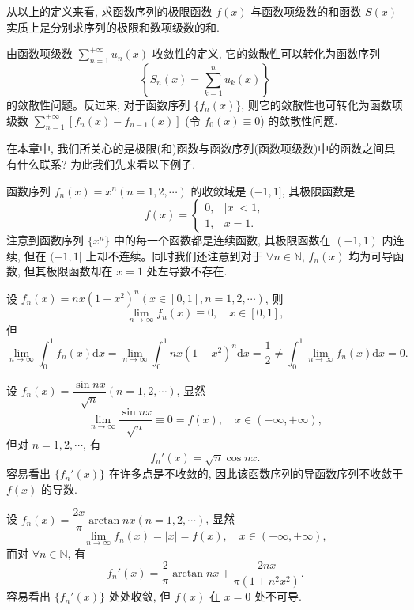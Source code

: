 从以上的定义来看, 求函数序列的极限函数 $f(x)$ 与函数项级数的和函数 $S(x)$ 实质上是分别求序列的极限和数项级数的和.

由函数项级数 $\sum\limits_{n=1}^{+\infty}u_n(x)$ 收敛性的定义, 它的敛散性可以转化为函数序列
\[
  \left\{S_n(x)=\sum_{k=1}^n u_k(x)\right\}
\]
的敛散性问题。反过来, 对于函数序列 $\{f_n(x)\}$, 则它的敛散性也可转化为函数项级数 $\sum\limits_{n=1}^{+\infty}[f_n(x)-f_{n-1}(x)]$ (令 $f_0(x)\equiv0$) 的敛散性问题.

在本章中, 我们所关心的是极限(和)函数与函数序列(函数项级数)中的函数之间具有什么联系? 为此我们先来看以下例子.

\begin{example}\label{example:ma-10-1-1}
函数序列 $f_n(x)=x^n(n=1,2,\cdots)$ 的收敛域是 $(-1,1]$, 其极限函数是
\[
  f(x)=
  \begin{cases}
    0, & |x|<1,\\
    1, & x=1.
  \end{cases}
\]
注意到函数序列 $\{x^n\}$ 中的每一个函数都是连续函数, 其极限函数在 $(-1,1)$ 内连续, 但在 $(-1,1]$ 上却不连续。同时我们还注意到对于 $\forall n\in\mathbb N$, $f_n(x)$ 均为可导函数, 但其极限函数却在 $x=1$ 处左导数不存在.
\end{example}


\begin{example}\label{example:ma-10-1-2}
设 $f_n(x)=nx(1-x^2)^n(x\in[0,1],n=1,2,\cdots)$, 则
\[
  \lim_{n\to\infty}f_n(x)\equiv0,\quad x\in[0,1],
\]
但
\[
  \lim_{n\to\infty}\int_0^1 f_n(x)\mathrm dx
  =\lim_{n\to\infty}\int_0^1 nx(1-x^2)^n\mathrm dx
  =\frac12
  \ne \int_0^1\lim_{n\to\infty}f_n(x)\mathrm dx=0.
\]
\end{example}


\begin{example}\label{example:ma-10-1-3}
设 $f_n(x)=\dfrac{\sin nx}{\sqrt n}(n=1,2,\cdots)$, 显然
\[
  \lim_{n\to\infty}\frac{\sin nx}{\sqrt n}\equiv0=f(x),\quad x\in(-\infty,+\infty),
\]
但对 $n=1,2,\cdots$, 有
\[
  f_n'(x)=\sqrt n\cos nx.
\]
容易看出 $\{f_n'(x)\}$ 在许多点是不收敛的, 因此该函数序列的导函数序列不收敛于 $f(x)$ 的导数.
\end{example}


\begin{example}\label{example:ma-10-1-4}
设 $f_n(x)=\dfrac{2x}{\pi}\arctan nx(n=1,2,\cdots)$, 显然
\[
  \lim_{n\to\infty}f_n(x)=|x|=f(x),\quad x\in(-\infty,+\infty),
\]
而对 $\forall n\in\mathbb N$, 有
\[
  f_n'(x)=\frac2\pi\arctan nx+\frac{2nx}{\pi(1+n^2x^2)}.
\]
容易看出 $\{f_n'(x)\}$ 处处收敛, 但 $f(x)$ 在 $x=0$ 处不可导.
\end{example}

